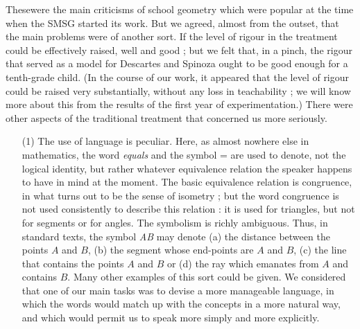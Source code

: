 These\pageoriginale were the main criticisms of school geometry which
were popular at the time when the SMSG started its work. But we
agreed, almost from the outset, that the main problems were of another
sort. If the level of rigour in the treatment could be effectively
raised, well and good ; but we felt that, in a pinch, the rigour that
served as a model for Descartes and Spinoza ought to be good enough
for a tenth-grade child. (In the course of our work, it appeared that
the level of rigour could be raised very substantially, without any
loss in teachability ; we will know more about this from the results
of the first year of experimentation.) There were other aspects of the
traditional treatment that concerned us more seriously.
\begin{itemize}
\item[(1)] The use of language is peculiar. Here, as almost nowhere
  else in mathematics, the word \textit{equals} and the symbol = are
  used to denote, not the logical identity, but rather whatever
  equivalence relation the speaker happens to have in mind at the
  moment. The basic equivalence relation is congruence, in what turns
  out to be the sense of isometry ; but the word congruence is not
  used consistently to describe this relation : it is used for
  triangles, but not for segments or for angles. The symbolism is
  richly ambiguous. Thus, in standard texts, the symbol \textit{AB}
  may denote (a) the distance between the points $A$ and $B$, (b) the
  segment whose end-points are $A$ and $B$, (c) the line that contains
  the points $A$ and $B$ or (d) the ray which emanates from $A$ and
  contains $B$. Many other examples of this sort could be given. We
  considered that one of our main tasks was to devise a more
  manageable language, in which the words would match up with the
  concepts in a more natural way, and which would permit us to speak
  more simply and more explicitly. 


\end{itemize}
